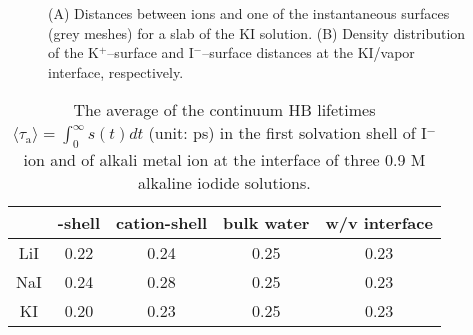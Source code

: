 \begin{figure}[H]%
    \centering
    \qquad
    \caption{
(A) 
Distances between ions and one of the instantaneous surfaces (grey meshes) for a slab of the KI solution. 
(B)
Density distribution of the K$^+$--surface and I$^-$--surface distances at the KI/vapor interface, respectively. 
}%
    \label{fig:prob_dist_K_surf_I_surf}%
\end{figure}
%
\begin{table}[H]
\centering
\caption{\label{tab:tau_hb_alkali_iodine} 
The average of the continuum HB lifetimes $\langle\tau_{\text{a}}\rangle=\int_0^\infty s(t) dt$ (unit: ps) in the first solvation shell of I$^-$ ion 
and of alkali metal ion at the interface of three 0.9 M alkaline iodide solutions.
}
\begin{tabular}{ccccc}
  &\I-shell &cation-shell & bulk water & w/v interface \\
\hline
 LiI & 0.22 & 0.24 & 0.25 & 0.23\\
 NaI & 0.24 & 0.28 & 0.25 & 0.23\\
 KI  & 0.20 & 0.23 & 0.25 &0.23\\
\end{tabular}
\end{table} 

